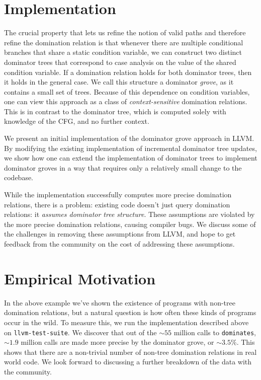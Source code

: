 \documentclass[a4paper,twocolumn]{article}
\begin{document}
\section*{Implementation}
The crucial property that lets us refine the notion of valid paths and
therefore refine the domination relation is that whenever there are multiple
conditional branches that share a static condition variable, we can construct
two distinct dominator trees that correspond to case analysis on the value of
the shared condition variable. If a domination relation holds for both
dominator trees, then it holds in the general case. We call this structure a
dominator \emph{grove}, as it contains a small set of trees. Because of this 
dependence on condition variables, one can view this approach as a class of 
\emph{context-sensitive} domination relations. This is in contrast to the
dominator tree, which is computed solely with knowledge of the CFG, and no
further context.

We present an initial implementation of the dominator grove approach in LLVM.
By modifying the existing implementation of incremental dominator tree updates,
we show how one can extend the implementation of dominator trees to implement
dominator groves in a way that requires only a relatively small change to the
codebase. 

While the implementation successfully computes more precise domination
relations, there is a problem: existing code doesn't just query domination
relations: it \emph{assumes dominator tree structure}. These assumptions are
violated by the more precise domination relations, causing compiler bugs. We
discuss some of the challenges in removing these assumptions from LLVM, and
hope to get feedback from the community on the cost of addressing these
assumptions.

\section*{Empirical Motivation}
In the above example we've shown the existence of programs with non-tree
domination relations, but a natural question is how often these kinds of
programs occur in the wild. To measure this, we run the implementation
described above on \texttt{llvm-test-suite}. We discover that out of the
$\sim55$ million calls to \texttt{dominates}, $\sim1.9$ million calls are made
more precise by the dominator grove, or $\sim3.5\%$. This shows that there are
a non-trivial number of non-tree domination relations in real world code. We
look forward to discussing a further breakdown of the data with the community.
\end{document}
